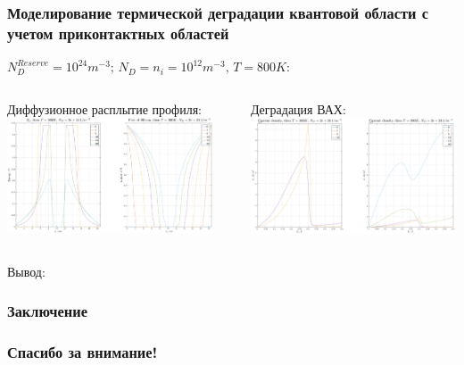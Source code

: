 \documentclass[10pt,pdf,hyperref={unicode},aspectratio={169}]{beamer}
\begin{document}
\begin{frame}
	\frametitle{Моделирование термической деградации квантовой области с учетом приконтактных областей}
	{\large\color{blue} $N_{D}^{Reserve} = 10^{24}m^{-3};\,N_{D} = n_{i} = 10^{12} m^{-3},\,T = 800K$:}\\
	\begin{columns}
		{\color{red} Диффузионное расплытие профиля:}\\
	   	\includegraphics[width=.99\linewidth,center]{assets/DAlGaAs_Si}\\
		\rule[0mm]{0.2ex}{40mm}
		{\color{red} Деградация ВАХ:}\\
	   	\includegraphics[width=.99\linewidth,center]{assets/JDAlGaAs_Si}\\
	\end{columns}
	{\large\color{blue}Вывод:}\\
\end{frame}

\begin{frame}
	\frametitle{Заключение}
\end{frame}

\begin{frame}
	\frametitle{Спасибо за внимание!}
\end{frame}
\end{document}
